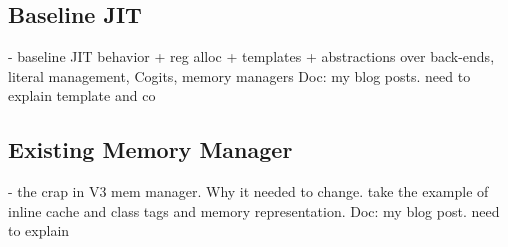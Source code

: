 \documentclass[a4paper,12pt,twoside]{../includes/ThesisStyle}
\begin{document}
\subsection{Baseline JIT}
- baseline JIT behavior + reg alloc + templates + abstractions over back-ends, literal management, Cogits, memory managers
Doc: my blog posts. need to explain template and co

\subsection{Existing Memory Manager}
- the crap in V3 mem manager. Why it needed to change.
take the example of inline cache and class tags and memory representation.
Doc: my blog post. need to explain

\ifx\wholebook\relax\else
    
\end{document}

